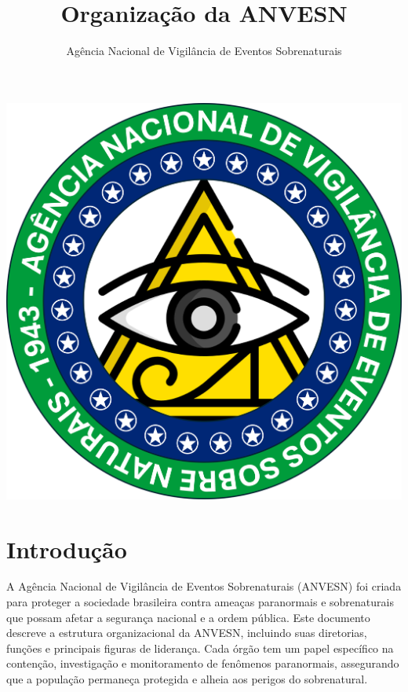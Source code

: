 \documentclass{book}
\title{Organização da ANVESN}
\author{Agência Nacional de Vigilância de Eventos Sobrenaturais}
\date{}
\begin{document}
\maketitle


\begin{center}
\newpage
\vspace*{\fill}
\includegraphics[scale=.9]{imagens/ANVESN_LOGO.png}
\vspace*{\fill}
\newpage
\end{center}

\frontmatter
\chapter*{Introdução}
A Agência Nacional de Vigilância de Eventos Sobrenaturais (ANVESN) foi criada para proteger a sociedade brasileira contra ameaças paranormais e sobrenaturais que possam afetar a segurança nacional e a ordem pública. Este documento descreve a estrutura organizacional da ANVESN, incluindo suas diretorias, funções e principais figuras de liderança. Cada órgão tem um papel específico na contenção, investigação e monitoramento de fenômenos paranormais, assegurando que a população permaneça protegida e alheia aos perigos do sobrenatural.

\tableofcontents

\mainmatter
\end{document}
